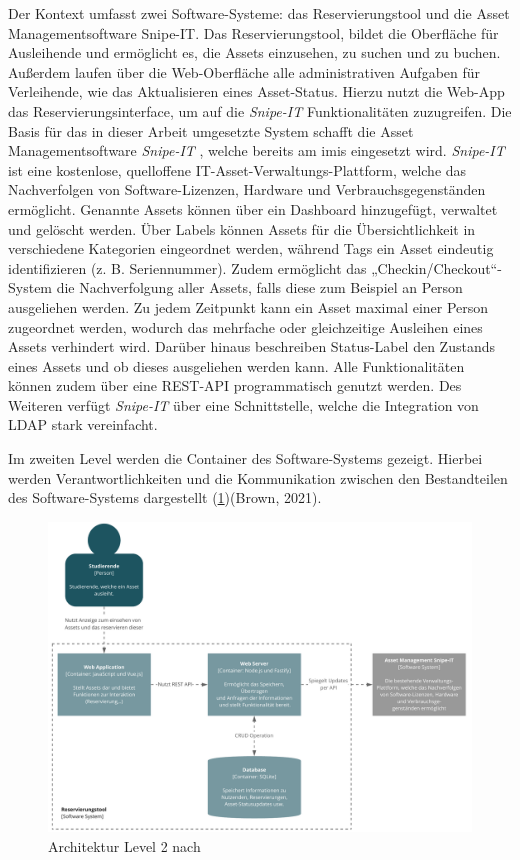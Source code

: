 Der Kontext umfasst zwei Software-Systeme: das Reservierungstool und die Asset Managementsoftware
Snipe-IT. Das Reservierungstool, bildet die Oberfläche für Ausleihende und ermöglicht es, die Assets
einzusehen, zu suchen und zu buchen. Außerdem laufen über die Web-Oberfläche alle administrativen
Aufgaben für Verleihende, wie das Aktualisieren eines Asset-Status. Hierzu nutzt die Web-App das
Reservierungsinterface, um auf die \textit{Snipe-IT} Funktionalitäten zuzugreifen.  
Die Basis für das in dieser Arbeit umgesetzte System schafft die Asset Managementsoftware
\textit{Snipe-IT} \cite{noauthor_home_nodate}, welche bereits am \ac{imis} eingesetzt wird.
\textit{Snipe-IT} ist eine kostenlose, quelloffene IT-Asset-Verwaltungs-Plattform, welche das
Nachverfolgen von Software-Lizenzen, Hardware und Verbrauchsgegenständen ermöglicht. Genannte Assets
können über ein Dashboard hinzugefügt, verwaltet und gelöscht werden. Über Labels können Assets für die
Übersichtlichkeit in verschiedene Kategorien eingeordnet werden, während Tags ein Asset eindeutig
identifizieren (z. B. Seriennummer). Zudem ermöglicht das „Checkin/Checkout“-System die
Nachverfolgung aller Assets, falls diese zum Beispiel an Person ausgeliehen werden. Zu jedem
Zeitpunkt kann ein Asset maximal einer Person zugeordnet werden, wodurch das mehrfache oder gleichzeitige
Ausleihen eines Assets verhindert wird. Darüber hinaus beschreiben Status-Label den Zustands eines
Assets und ob dieses ausgeliehen werden kann. Alle Funktionalitäten können zudem über eine REST-API
programmatisch genutzt werden. Des Weiteren verfügt \textit{Snipe-IT} über eine Schnittstelle,
welche die Integration von LDAP stark vereinfacht.

{\sffamily\color{maincolor}{Level 2: Container}}

Im zweiten Level werden die Container des Software-Systems gezeigt. Hierbei werden Verantwortlichkeiten und
die Kommunikation zwischen den Bestandteilen des Software-Systems dargestellt (\ref{fig:level2})(Brown, 2021). 

\begin{figure}[h]
    \centering
    \includegraphics[scale=0.47]{Bilder/level2.pdf}
    \caption[Architektur Level 2]{Architektur Level 2 nach }
    \label{fig:level2}
\end{figure}

